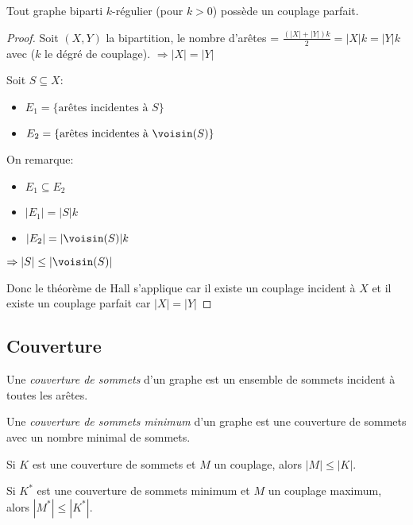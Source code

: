 \begin{mycorr}
  \label{corr:hall}
  Tout graphe biparti $k$-régulier (pour $k > 0$) possède un couplage parfait.
  \begin{proof}
  Soit $(X,Y)$ la bipartition, le nombre d'arêtes = $\frac{(|X| + |Y|) k}{2} = |X| k = |Y| k$ avec ($k$ le dégré de couplage). $\Rightarrow |X| = |Y|$

  Soit $S \subseteq X$:
  \begin{itemize}
    \item $E_{1} = \lbrace \text{arêtes incidentes à }S \rbrace$
    \item $E_{2} = \lbrace \text{arêtes\ incidentes à }\voisin(S) \rbrace$
  \end{itemize}

  On remarque:
  \begin{itemize}
  \item $E_{1} \subseteq E_{2}$
  \item $|E_{1}| = |S| k$
  \item $|E_{2}| = |\voisin(S)| k$
  \end{itemize}
  $\Rightarrow |S| \leq |\voisin(S)|$

  Donc le théorème de Hall s'applique car il existe un couplage incident à $X$ et il existe un couplage parfait car $|X|=|Y|$
  \end{proof}
\end{mycorr}

\subsection{Couverture}
\begin{mydef}
  Une \emph{couverture de sommets} d’un graphe est un ensemble de sommets incident à toutes les arêtes.
\end{mydef}

\begin{mydef}
  Une \emph{couverture de sommets minimum} d’un graphe est une couverture de sommets avec un nombre minimal de sommets.
\end{mydef}

\begin{myrem}
  Si $K$ est une couverture de sommets et $M$ un couplage, alors $|M| \leq |K|$.
\end{myrem}

\begin{myrem}
  Si $K^*$ est une couverture de sommets minimum et $M$ un couplage maximum, alors $|M^*| \leq |K^*|$.
\end{myrem}

